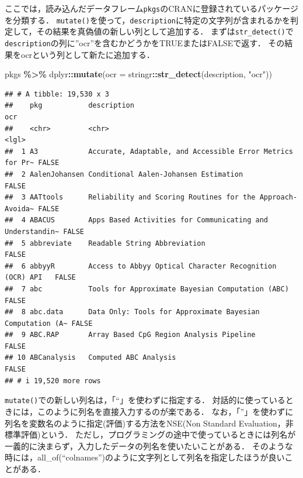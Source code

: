 \documentclass[
]{article}
\newenvironment{Shaded}{\begin{snugshade}}{\end{snugshade}}
\newcommand{\AttributeTok}[1]{\textcolor[rgb]{0.13,0.29,0.53}{#1}}
\newcommand{\FunctionTok}[1]{\textcolor[rgb]{0.13,0.29,0.53}{\textbf{#1}}}
\newcommand{\NormalTok}[1]{#1}
\newcommand{\SpecialCharTok}[1]{\textcolor[rgb]{0.81,0.36,0.00}{\textbf{#1}}}
\newcommand{\StringTok}[1]{\textcolor[rgb]{0.31,0.60,0.02}{#1}}
\begin{document}
ここでは，読み込んだデータフレーム\texttt{pkgs}のCRANに登録されているパッケージを分類する．
\texttt{mutate()}を使って，\texttt{description}に特定の文字列が含まれるかを判定して，その結果を真偽値の新しい列として追加する．
まずは\texttt{str\_detect()}で\texttt{description}の列に''ocr''を含むかどうかをTRUEまたはFALSEで返す．
その結果をocrという列として新たに追加する．

\begin{Shaded}
\begin{Highlighting}[]
\NormalTok{pkgs }\SpecialCharTok{\%\textgreater{}\%}
\NormalTok{  dplyr}\SpecialCharTok{::}\FunctionTok{mutate}\NormalTok{(}\AttributeTok{ocr =}\NormalTok{ stringr}\SpecialCharTok{::}\FunctionTok{str\_detect}\NormalTok{(description, }\StringTok{"ocr"}\NormalTok{))}
\end{Highlighting}
\end{Shaded}

\begin{verbatim}
## # A tibble: 19,530 x 3
##    pkg           description                                               ocr  
##    <chr>         <chr>                                                     <lgl>
##  1 A3            Accurate, Adaptable, and Accessible Error Metrics for Pr~ FALSE
##  2 AalenJohansen Conditional Aalen-Johansen Estimation                     FALSE
##  3 AATtools      Reliability and Scoring Routines for the Approach-Avoida~ FALSE
##  4 ABACUS        Apps Based Activities for Communicating and Understandin~ FALSE
##  5 abbreviate    Readable String Abbreviation                              FALSE
##  6 abbyyR        Access to Abbyy Optical Character Recognition (OCR) API   FALSE
##  7 abc           Tools for Approximate Bayesian Computation (ABC)          FALSE
##  8 abc.data      Data Only: Tools for Approximate Bayesian Computation (A~ FALSE
##  9 ABC.RAP       Array Based CpG Region Analysis Pipeline                  FALSE
## 10 ABCanalysis   Computed ABC Analysis                                     FALSE
## # i 19,520 more rows
\end{verbatim}

\texttt{mutate()}での新しい列名は，「``」を使わずに指定する．
対話的に使っているときには，このように列名を直接入力するのが楽である．
なお，「''」を使わずに列名を変数名のように指定(評価)する方法をNSE(Non Standard Evaluation，非標準評価)という．
ただし，プログラミングの途中で使っているときには列名が一義的に決まらず，入力したデータの列名を使いたいことがある．
そのような時には，all\_of(``colnames'')のように文字列として列名を指定したほうが良いことがある．
\end{document}
